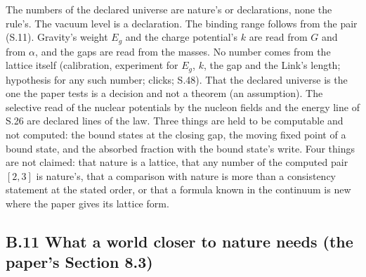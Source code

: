 \documentclass[pdflatex,sn-mathphys-num]{sn-jnl}
\theoremstyle{thmstyleone}
\begin{document}
The numbers of the declared universe are nature's or declarations, none the rule's. The vacuum level is a declaration. The binding range follows from the pair (S.11). Gravity's weight $E_g$ and the charge potential's $k$ are read from $G$ and from $\alpha$, and the gaps are read from the masses. No number comes from the lattice itself (calibration, experiment for $E_g$, $k$, the gap and the Link's length; hypothesis for any such number; clicks; S.48). That the declared universe is the one the paper tests is a decision and not a theorem (an assumption). The selective read of the nuclear potentials by the nucleon fields and the energy line of S.26 are declared lines of the law. Three things are held to be computable and not computed: the bound states at the closing gap, the moving fixed point of a bound state, and the absorbed fraction with the bound state's write. Four things are not claimed: that nature is a lattice, that any number of the computed pair $[2, 3]$ is nature's, that a comparison with nature is more than a consistency statement at the stated order, or that a formula known in the continuum is new where the paper gives its lattice form.

\subsection*{B.11 What a world closer to nature needs (the paper's Section 8.3)}
\end{document}
